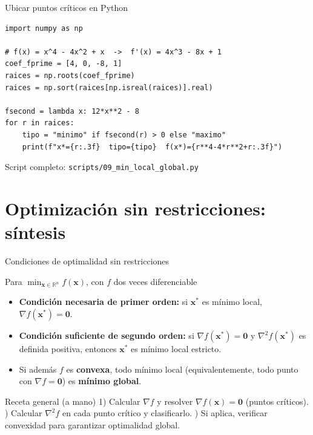 \documentclass[aspectratio=169,10pt]{beamer}
\newcommand{\R}{\mathbb{R}}
\newcommand{\grad}{\nabla}
\newcommand{\x}{\mathbf{x}}
\newcommand{\Hess}{\nabla^2 f}
\begin{document}
\begin{frame}[fragile]{Ubicar puntos críticos en Python}
\begin{lstlisting}
import numpy as np

# f(x) = x^4 - 4x^2 + x  ->  f'(x) = 4x^3 - 8x + 1
coef_fprime = [4, 0, -8, 1]
raices = np.roots(coef_fprime)
raices = np.sort(raices[np.isreal(raices)].real)

fsecond = lambda x: 12*x**2 - 8
for r in raices:
    tipo = "minimo" if fsecond(r) > 0 else "maximo"
    print(f"x*={r:.3f}  tipo={tipo}  f(x*)={r**4-4*r**2+r:.3f}")
\end{lstlisting}
  \small Script completo: \texttt{scripts/09\_min\_local\_global.py}
\end{frame}

\section{Optimización sin restricciones: síntesis}

\begin{frame}{Condiciones de optimalidad sin restricciones}
  \begin{block}{Para $\min_{\x\in\R^n} f(\x)$, con $f$ dos veces diferenciable}
    \begin{itemize}
      \item \textbf{Condición necesaria de primer orden:} si $\x^*$ es
        mínimo local, $\grad f(\x^*)=\mathbf 0$.
      \item \textbf{Condición suficiente de segundo orden:} si
        $\grad f(\x^*)=\mathbf 0$ y $\Hess(\x^*)$ es definida positiva,
        entonces $\x^*$ es mínimo local estricto.
      \item Si además $f$ es \textbf{convexa}, todo mínimo local
        (equivalentemente, todo punto con $\grad f=\mathbf 0$) es
        \textbf{mínimo global}.
    \end{itemize}
  \end{block}
  \begin{alertblock}{Receta general (a mano)}
    1) Calcular $\grad f$ y resolver $\grad f(\x)=\mathbf 0$ (puntos
    críticos). ) Calcular $\Hess$ en cada punto crítico y
    clasificarlo. ) Si aplica, verificar convexidad para garantizar
    optimalidad global.
  \end{alertblock}
\end{frame}
\end{document}
